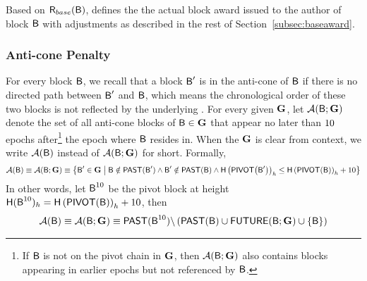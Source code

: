	Based on $\textsf{R}_{base}(\textsf{B})$, 
	\name defines the the actual block award issued to the author of block $\textsf{B}$ with  adjustments as described in the rest of Section~\ref{subsec:baseaward}.



\subsubsection{Anti-cone Penalty}
\label{subsec:anticone}

For every block $\textsf{B}$, we recall that a block $\textsf{B}'$ is in the anti-cone of $\textsf{B}$ if there is no directed path between $\textsf{B}'$ and $\textsf{B}$, which means the chronological order of these two blocks is not reflected by the underlying \tg.
For every given \tg $\textbf{G}$, let $\mathcal{A}(\textsf{B};\textbf{G})$ denote the set of all anti-cone blocks of $\textsf{B}\in\textbf{G}$ that appear no later than ${10}$ epochs after\footnote{If $\textsf{B}$ is not on the pivot chain in $\textbf{G}$, then $\mathcal{A}(\textsf{B};\textbf{G})$ also contains blocks appearing in earlier epochs but not referenced by $\textsf{B}$.} the epoch where $\textsf{B}$ resides in.
When the \tg $\textbf{G}$ is clear from context, we write $\mathcal{A}(\textsf{B})$ instead of $\mathcal{A}(\textsf{B};\textbf{G})$ for short. 
Formally,
\begin{align}
	\mathcal{A}(\textsf{B})\equiv \mathcal{A}(\textsf{B};\textbf{G}) \equiv  {\left \{{\textsf{B}' \in \textbf{G}\;\big|\; \textsf{B}\notin\ensuremath{\mathsf{PAST}}(\textsf{B}') \land \textsf{B}'\notin\ensuremath{\mathsf{PAST}}(\textsf{B})  \land \textsf{H}\left(\ensuremath{\mathsf{PIVOT}{\left({\textsf{B}'} \right)}}\right)_h\le \textsf{H}\left(\ensuremath{\mathsf{PIVOT}{\left({\textsf{B}} \right)}}\right)_h+10 } \right \}}   
\end{align}
In other words, let $\textsf{B}^{10}$ be the pivot block at height $\textsf{H}(\textsf{B}^{10})_h=\textsf{H}\left(\mathsf{PIVOT}{\left({\textsf{B}} \right)}\right)_h+10$,
then 
\begin{align}
	\mathcal{A}(\textsf{B})\equiv \mathcal{A}(\textsf{B};\textbf{G}) \equiv \mathsf{PAST}(\textsf{B}^{10})\backslash\left( \mathsf{PAST}(\textsf{B})\cup \mathsf{FUTURE}(\textsf{B};\textbf{G}) \cup {\left \{{\textsf{B}} \right \}} \right)
\end{align}

